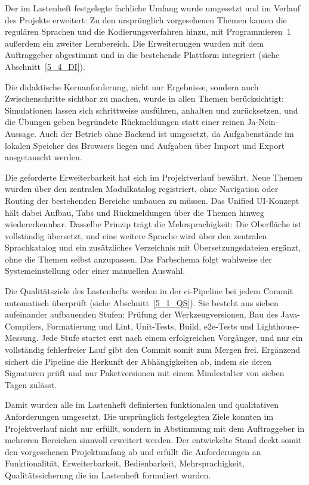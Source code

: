  \label{5_2_LH}

Der im Lastenheft festgelegte fachliche Umfang wurde
umgesetzt und im Verlauf des Projekts erweitert: Zu den ursprünglich vorgesehenen
Themen kamen die regulären Sprachen und die Kodierungsverfahren hinzu, mit
Programmieren~1 außerdem ein zweiter Lernbereich.
Die Erweiterungen wurden mit dem Auftraggeber abgestimmt und in die bestehende
Plattform integriert (siehe Abschnitt~\ref{5_4_DI}).

Die didaktische Kernanforderung, nicht nur Ergebnisse, sondern auch Zwischenschritte
sichtbar zu machen, wurde in allen Themen berücksichtigt: Simulationen lassen sich
schrittweise ausführen, anhalten und zurücksetzen, und die Übungen geben begründete
Rückmeldungen statt einer reinen Ja-Nein-Aussage.
Auch der Betrieb ohne Backend ist umgesetzt, da Aufgabenstände im lokalen Speicher
des Browsers liegen und Aufgaben über Import und Export ausgetauscht werden.

Die geforderte Erweiterbarkeit hat sich im Projektverlauf bewährt.
Neue Themen wurden über den zentralen Modulkatalog registriert, ohne Navigation oder
Routing der bestehenden Bereiche umbauen zu müssen.
Das Unified UI-Konzept hält dabei Aufbau, Tabs und Rückmeldungen über die Themen
hinweg wiedererkennbar.
Dasselbe Prinzip trägt die Mehrsprachigkeit: Die Oberfläche ist vollständig
übersetzt, und eine weitere Sprache wird über den zentralen Sprachkatalog und ein
zusätzliches Verzeichnis mit Übersetzungsdateien ergänzt, ohne die Themen selbst
anzupassen.
Das Farbschema folgt wahlweise der Systemeinstellung oder einer manuellen Auswahl.

Die Qualitätsziele des Lastenhefts werden in der \gls{ci}-Pipeline bei jedem Commit
automatisch überprüft (siehe Abschnitt~\ref{5_1_QS}).
Sie besteht aus sieben aufeinander aufbauenden Stufen: Prüfung der
Werkzeugversionen, Bau des Java-Compilers, Formatierung und Lint, Unit-Tests,
Build, \gls{e2e}-Tests und Lighthouse-Messung.
Jede Stufe startet erst nach einem erfolgreichen Vorgänger, und nur ein
vollständig fehlerfreier Lauf gibt den Commit somit zum Mergen frei.
Ergänzend sichert die Pipeline die Herkunft der Abhängigkeiten ab, indem sie deren
Signaturen prüft und nur Paketversionen mit einem Mindestalter von sieben Tagen
zulässt.

Damit wurden alle im Lastenheft definierten funktionalen und qualitativen 
Anforderungen umgesetzt. Die ursprünglich festgelegten Ziele konnten im Projektverlauf 
nicht nur erfüllt, sondern in Abstimmung mit dem Auftraggeber in mehreren 
Bereichen sinnvoll erweitert werden. Der entwickelte Stand deckt somit den vorgesehenen 
Projektumfang ab und erfüllt die Anforderungen an Funktionalität, Erweiterbarkeit, 
Bedienbarkeit, Mehrsprachigkeit, Qualitätssicherung die im Lastenheft formuliert wurden.